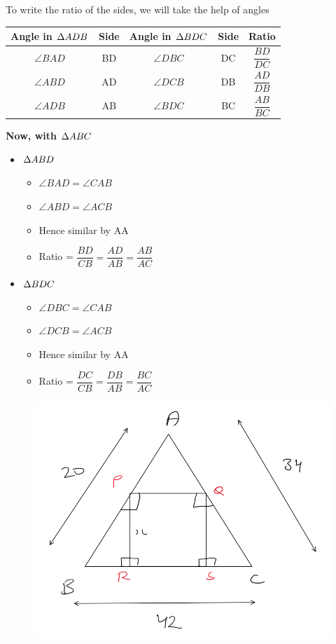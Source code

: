 To write the ratio of the sides, we will take the help of angles
\begin{table}[h!]
    \centering
    \begin{tabular}{|| c | c | c | c | c ||}
        \hline
         Angle in $\Delta {ADB}$ & Side & Angle in $\Delta {BDC}$ & Side & Ratio  \\
        \hline
         $\angle{BAD}$ & BD & $\angle{DBC}$ & DC & $\dfrac{BD}{DC}$ \\ 
         \hline
         $\angle{ABD}$ & AD & $\angle{DCB}$ & DB & $\dfrac{AD}{DB}$ \\ 
         \hline
         $\angle{ADB}$ & AB & $\angle{BDC}$ & BC & $\dfrac{AB}{BC}$ \\ 
         \hline
    \end{tabular}
\end{table}

\textbf{ Now, with $\Delta {ABC}$}
\begin{itemize}
    \item $\Delta {ABD}$
    \begin{itemize}
        \item $\angle{BAD} = \angle{CAB}$
        \item $\angle{ABD} = \angle{ACB}$
        \item Hence similar by AA
        \item Ratio = $\dfrac{BD}{CB} = \dfrac{AD}{AB} = \dfrac{AB}{AC}$
    \end{itemize}

    \item $\Delta {BDC}$
    \begin{itemize}
        \item $\angle{DBC} = \angle{CAB}$
        \item $\angle{DCB} = \angle{ACB}$
        \item Hence similar by AA
        \item Ratio = $\dfrac{DC}{CB} = \dfrac{DB}{AB} = \dfrac{BC}{AC}$
    \end{itemize}
\end{itemize}


\begin{figure}[h!]
    \centering
    \includegraphics[width=0.5\linewidth]{Quant//Geometry//Images//Triangles/rodha_triangle_6_question_1.png}
\end{figure}

